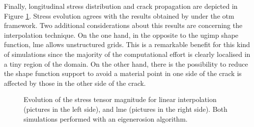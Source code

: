 \documentclass[preprint,12pt,a4paper]{elsarticle}
\begin{document}
Finally, longitudinal stress distribution and crack propagation are
depicted in Figure \ref{fig:Stress-vs-damage-impact-test}. Stress
evolution agrees with the results obtained by \cite{Navas_2017_ES}
under the \acrshort{otm} framework. Two additional considerations about
this results are concerning the interpolation technique. On the one hand,
in the opposite to the \acrshort{ugimp} shape function, \acrshort{lme}
allows unstructured grids. This is a remarkable benefit for this kind
of simulations since the majority of the computational effort is
clearly localised in a tiny region of the domain. On the other
hand, there is the possibility to reduce the shape function support to avoid
a material point in one side of the crack is affected by those in the
other side of the crack. 
\begin{figure}
\centering
{}
\caption{Evolution of the stress tensor magnitude for linear
  interpolation (pictures in the left side), and \acrshort{lme}
  (pictures in the right side). Both simulations performed with an
  eigenerosion algorithm.}
\label{fig:Stress-vs-damage-impact-test}
\end{figure}
\end{document}
